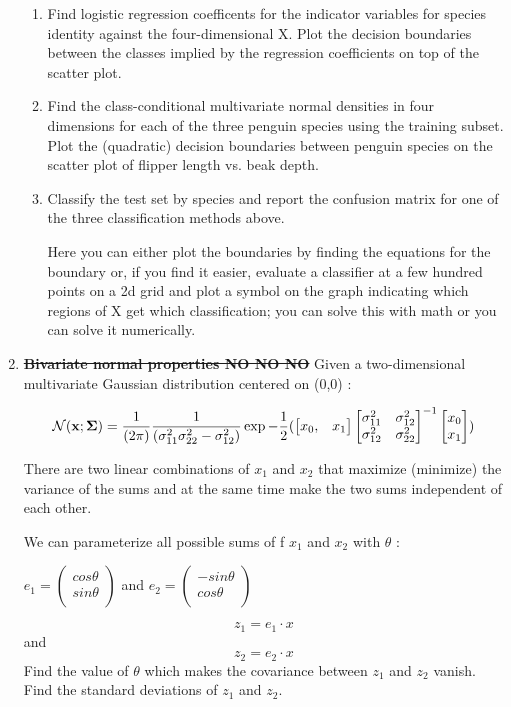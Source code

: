 \documentclass[12pt]{book}
\theoremstyle{definition}
\begin{document}
\begin{enumerate}
\begin{enumerate}[label=(\alph*)]
\item
Find logistic regression coefficents for the indicator variables for species identity against the four-dimensional X. 
Plot the decision boundaries between the classes implied by the regression coefficients on top of the scatter plot.

\item
Find the class-conditional multivariate normal densities in four dimensions for each of the three penguin species using the training subset.
Plot the (quadratic) decision boundaries between penguin species on the scatter plot of flipper length vs. beak depth.

\item
Classify the test set by species and report the confusion matrix for one of the three classification methods above.

Here you can either plot the boundaries by finding the equations for the boundary or, if you find it easier, evaluate a classifier at a few hundred points on a 2d grid and plot a symbol on the graph indicating which regions of X get which classification; you can solve this with math or you can solve it numerically.  
\end{enumerate}


\item\label{normal}
\textbf{\sout{Bivariate normal properties NO NO NO }}
Given a two-dimensional multivariate Gaussian distribution centered on (0,0) : 

$$ \mathcal{N} ( \mathbf{x} ; \mathbf{\Sigma} ) =
{ 1 \over( 2 \pi  ) }  
{ 1 \over ( \sigma_{11}^2\sigma_{22}^2 - \sigma_{12}^2 )   }
\exp  - { 1 \over 2} (
\begin{bmatrix}
x_0, & x_1
\end{bmatrix}
\begin{bmatrix}
\sigma_{11}^2 & \sigma_{12}^2\\
\sigma_{12}^2 & \sigma_{22}^2
\end{bmatrix}^{-1}
\begin{bmatrix}
x_0 \\
x_1
\end{bmatrix} ) $$

There are two linear combinations of $x_1$ and $x_2$ that maximize (minimize) the variance of the sums
and at the same time make the two sums independent of each other.

We can parameterize all possible sums of f $x_1$ and $x_2$  with $\theta$ : 

$e_1 = \begin{pmatrix} 
cos \theta \\
sin \theta   \\
\end{pmatrix} $ 
and 
 $e_2 = \begin{pmatrix} 
-sin \theta \\
cos \theta   \\
\end{pmatrix} $ 

$$ z_1 = e_1 \cdot x $$
and
$$ z_2 = e_2 \cdot x $$
Find the value of $\theta$ which makes the covariance between  $z_1$ and $z_2$ vanish.  Find the standard deviations of $z_1$ and $z_2$.



\end{enumerate}
\end{document}
